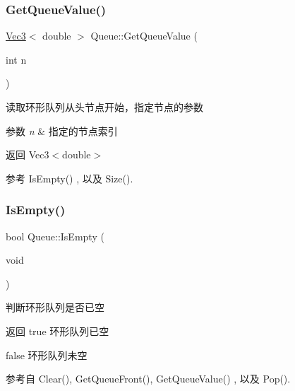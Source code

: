 \subsubsection{\texorpdfstring{Get\+Queue\+Value()}{GetQueueValue()}}
{\footnotesize\ttfamily \hyperlink{cppTypes_8h_a65c27bf97693676535dd0b30ea0ad399}{Vec3}$<$ double $>$ Queue\+::\+Get\+Queue\+Value (\begin{DoxyParamCaption}\item[{int}]{n }\end{DoxyParamCaption})}



读取环形队列从头节点开始，指定节点的参数 


\begin{DoxyParams}{参数}
{\em n} & 指定的节点索引 \\
\hline
\end{DoxyParams}
\begin{DoxyReturn}{返回}
Vec3$<$double$>$ 
\end{DoxyReturn}


参考 Is\+Empty() , 以及 Size().

\mbox{\label{classquadruped_1_1Queue_a75f7837ac00080f790075a42491d22b8}} 
\subsubsection{\texorpdfstring{Is\+Empty()}{IsEmpty()}}
{\footnotesize\ttfamily bool Queue\+::\+Is\+Empty (\begin{DoxyParamCaption}\item[{void}]{ }\end{DoxyParamCaption})}



判断环形队列是否已空 

\begin{DoxyReturn}{返回}
true 环形队列已空 

false 环形队列未空 
\end{DoxyReturn}


参考自 Clear(), Get\+Queue\+Front(), Get\+Queue\+Value() , 以及 Pop().

\mbox{\label{classquadruped_1_1Queue_a5371fc49bf2f44410aed19b17f6f4cc2}} 
